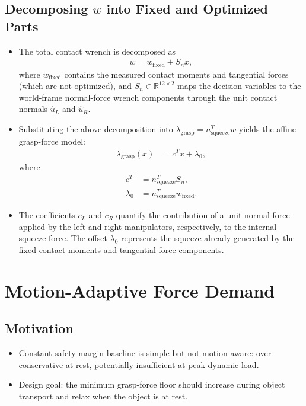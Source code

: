 \documentclass[conference]{IEEEtran}
\begin{document}
\subsection*{Decomposing $w$ into Fixed and Optimized Parts}
\begin{itemize}
    \item The total contact wrench is decomposed as
    \begin{align}
        w = w_{\mathrm{fixed}} + S_n x,
    \end{align}
    where \(w_{\mathrm{fixed}}\) contains the measured contact moments and
    tangential forces (which are not optimized), and
    \(S_n \in \mathbb{R}^{12 \times 2}\) maps the decision variables to the
    world-frame normal-force wrench components through the unit contact normals
    \(\hat{u}_L\) and \(\hat{u}_R\).

    \item Substituting the above decomposition into
    \(\lambda_{\mathrm{grasp}} = n_{\mathrm{squeeze}}^{T} w\) yields the affine
    grasp-force model:
    \begin{align}
        \lambda_{\mathrm{grasp}}(x)
        &= c^{T} x + \lambda_{0},
    \end{align}
    where
    \begin{align}
        c^{T} &= n_{\mathrm{squeeze}}^{T} S_n, \\
        \lambda_{0} &= n_{\mathrm{squeeze}}^{T} w_{\mathrm{fixed}}.
    \end{align}

    \item The coefficients \(c_L\) and \(c_R\) quantify the contribution of a
    unit normal force applied by the left and right manipulators,
    respectively, to the internal squeeze force. The offset
    \(\lambda_{0}\) represents the squeeze already generated by the fixed
    contact moments and tangential force components.
\end{itemize}


\section*{Motion-Adaptive Force Demand}
\subsection*{Motivation}
\begin{itemize}
    \item Constant-safety-margin baseline is simple but not motion-aware: over-conservative at rest, potentially insufficient at peak dynamic load.

    \item Design goal: the minimum grasp-force floor should increase during object transport and relax when the object is at rest.
\end{itemize}
\end{document}
